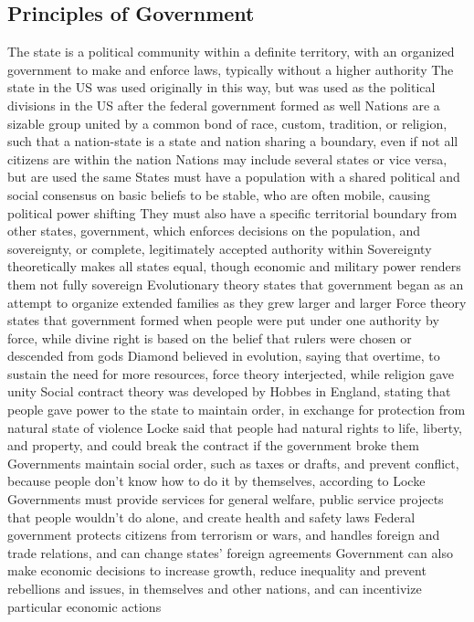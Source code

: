 \documentclass[11 pt, twoside]{article}
\newenvironment{outline*}
{
	\begin{outline}[enumerate]
	}
	{\end{outline}
}
\begin{document}
\subsection{Principles of Government}
\begin{outline*}
\1 The state is a political community within a definite territory, with an organized government to make and enforce laws, typically without a higher authority
\2 The state in the US was used originally in this way, but was used as the political divisions in the US after the federal government formed as well
\2 Nations are a sizable group united by a common bond of race, custom, tradition, or religion, such that a nation-state is a state and nation sharing a boundary, even if not all citizens are within the nation
\2 Nations may include several states or vice versa, but are used the same
\1 States must have a population with a shared political and social consensus on basic beliefs to be stable, who are often mobile, causing political power shifting
\2 They must also have a specific territorial boundary from other states, government, which enforces decisions on the population, and sovereignty, or complete, legitimately accepted authority within
\2 Sovereignty theoretically makes all states equal, though economic and military power renders them not fully sovereign
\1 Evolutionary theory states that government began as an attempt to organize extended families as they grew larger and larger
\2 Force theory states that government formed when people were put under one authority by force, while divine right is based on the belief that rulers were chosen or descended from gods
\2 Diamond believed in evolution, saying that overtime, to sustain the need for more resources, force theory interjected, while religion gave unity
\2 Social contract theory was developed by Hobbes in England, stating that people gave power to the state to maintain order, in exchange for protection from natural state of violence
\2 Locke said that people had natural rights to life, liberty, and property, and could break the contract if the government broke them
\1 Governments maintain social order, such as taxes or drafts, and prevent conflict, because people don’t know how to do it by themselves, according to Locke
\2 Governments must provide services for general welfare, public service projects that people wouldn’t do alone, and create health and safety laws
\2 Federal government protects citizens from terrorism or wars, and handles foreign and trade relations, and can change states' foreign agreements
\2 Government can also make economic decisions to increase growth, reduce inequality and prevent rebellions and issues, in themselves and other nations, and can incentivize particular economic actions
\end{outline*}
\end{document}
